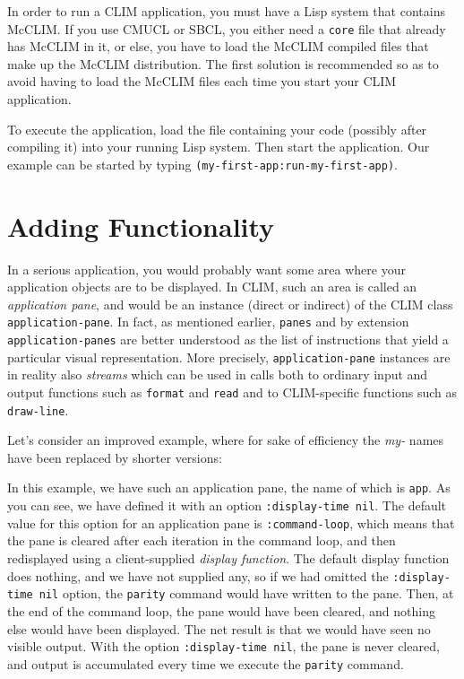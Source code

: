 In order to run a CLIM application, you must have a Lisp system that
contains McCLIM.  If you use CMUCL or SBCL, you either need a
\texttt{core} file that already has McCLIM in it, or else, you have to
load the McCLIM compiled files that make up the McCLIM distribution.
The first solution is recommended so as to avoid having to load the
McCLIM files each time you start your CLIM application.

To execute the application, load the file containing your code
(possibly after compiling it) into your running Lisp system.  Then
start the application.  Our example can be started by typing
\texttt{(my-first-app:run-my-first-app)}.

\section{Adding Functionality}

In a serious application, you would probably want some area where your
application objects are to be displayed.  In CLIM, such an area is
called an \emph{application pane}, and would be an instance (direct or
indirect) of the CLIM class \texttt{application-pane}.  In fact, as
mentioned earlier, \texttt{panes} and by extension
\texttt{application-panes} are better understood as the list of
instructions that yield a particular visual representation. More
precisely, \texttt{application-pane} instances are in reality also
\emph{streams} which can be used in calls both to ordinary input and
output functions such as \texttt{format} and \texttt{read} and to
CLIM-specific functions such as \texttt{draw-line}.

Let's consider an improved example, where for sake of efficiency the
\emph{my-} names have been replaced by shorter versions:




In this example, we have such an application pane, the name of which
is \texttt{app}.  As you can see, we have defined it with an option
\texttt{:display-time nil}.  The default value for this option for an
application pane is \texttt{:command-loop}, which means that the pane
is cleared after each iteration in the command loop, and then
redisplayed using a client-supplied \emph{display function}.  The
default display function does nothing, and we have not supplied any,
so if we had omitted the \texttt{:display-time nil} option, the
\texttt{parity} command would have written to the pane.  Then, at the
end of the command loop, the pane would have been cleared, and nothing
else would have been displayed.  The net result is that we would have
seen no visible output.  With the option \texttt{:display-time nil},
the pane is never cleared, and output is accumulated every time we
execute the \texttt{parity} command.


